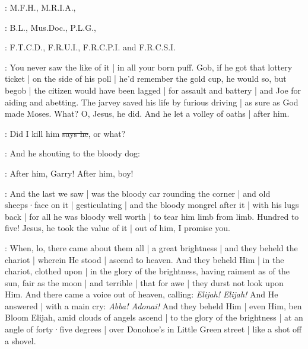 :
M.F.H.,
M.R.I.A.,

:
B.L.,
Mus.Doc.,
P.L.G.,

:
F.T.C.D.,
F.R.U.I.,
F.R.C.P.I.
and F.R.C.S.I.

\Nq:
You never saw the like of it |
in all your born puff.
Gob,
if he got that lottery ticket |
on the side of his poll |
he'd remember the gold cup,
he would so,
but begob |
the citizen would have been lagged |
for assault and battery |
and Joe for aiding and abetting.
The jarvey saved his life by furious driving |
as sure as God made Moses.
What?
O, Jesus,
he did.
And he let a volley of oaths |
after him.

\citizen:
Did I kill him
\sout{says he},
or what?

\Nq:
And he shouting to the bloody dog:

\citizen:
After him,
Garry!
After him,
boy!

\Nq:
And the last we saw |
was the bloody car rounding the corner |
and old sheeps·face on it |
gesticulating |
and the bloody mongrel after it |
with his lugs back |
for all he was bloody well worth |
to tear him limb from limb.
Hundred to five!
Jesus,
he took the value of it |
out of him,
I promise you.

:
When,
lo,
there came about them all |
a great brightness |
and they beheld the chariot |
wherein He stood |
ascend to heaven.
And they beheld Him |
in the chariot,
clothed upon |
in the glory of the brightness,
having raiment as of the sun,
fair as the moon |
and terrible |
that for awe |
they durst not look upon Him.
And there came a voice out of heaven,
calling:
\emph{Elijah!
Elijah!}
And He answered |
with a main cry:
\emph{Abba!
Adonai!}
And they beheld Him |
even Him,
ben Bloom Elijah,
amid clouds of angels ascend |
to the glory of the brightness |
at an angle of forty·five degrees |
over Donohoe's in Little Green street |
like a shot off a shovel.
